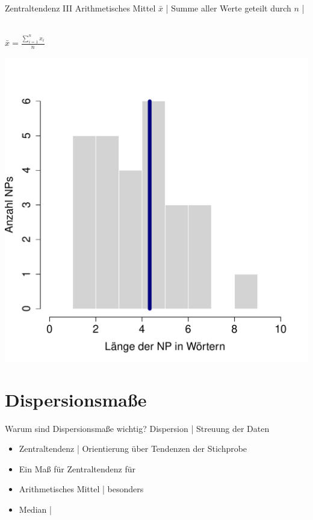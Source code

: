 \begin{frame}
  {Zentraltendenz III}
  \alert{Arithmetisches Mittel} $\bar{x}$ | Summe aller Werte geteilt durch $n$ | \\
  \Zeile
  \begin{multicols}{2}
    \centering 
    \hspace{0em}\\
    \vspace{0.1\textheight}
    $\bar{x}=\frac{\sum\limits_{i=1}^{n}x_i}{n}$
    \newpage
    \raggedright
    \includegraphics[height=0.6\textheight]{RVorlesung/mean}
  \end{multicols}
\end{frame}



\section{Dispersionsmaße}

\begin{frame}
  {Warum sind Dispersionsmaße wichtig?}
  \alert{Dispersion} | Streuung der Daten\\
  \Zeile
  \begin{itemize}[<+->]
    \item \alert{Zentraltendenz} | Orientierung über Tendenzen der Stichprobe
     \Zeile 
    \item \alert{Ein Maß für Zentraltendenz} für 
      \Halbzeile
    \item Arithmetisches Mittel | besonders 
    \item Median | 
  \end{itemize}
\end{frame}

